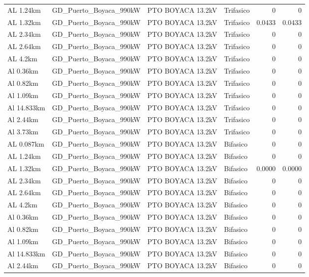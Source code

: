 \documentclass[11pt,a4paper]{article}
\begin{document}
\begin{longtable}{llllrr}
AL 1.24km & GD\_Puerto\_Boyaca\_990kW & PTO BOYACA 13.2kV & Trifasico & 0 & 0 \\
AL 1.32km & GD\_Puerto\_Boyaca\_990kW & PTO BOYACA 13.2kV & Trifasico & 0.0433 & 0.0433 \\
AL 2.34km & GD\_Puerto\_Boyaca\_990kW & PTO BOYACA 13.2kV & Trifasico & 0 & 0 \\
AL 2.64km & GD\_Puerto\_Boyaca\_990kW & PTO BOYACA 13.2kV & Trifasico & 0 & 0 \\
AL 4.2km & GD\_Puerto\_Boyaca\_990kW & PTO BOYACA 13.2kV & Trifasico & 0 & 0 \\
Al 0.36km & GD\_Puerto\_Boyaca\_990kW & PTO BOYACA 13.2kV & Trifasico & 0 & 0 \\
Al 0.82km & GD\_Puerto\_Boyaca\_990kW & PTO BOYACA 13.2kV & Trifasico & 0 & 0 \\
Al 1.09km & GD\_Puerto\_Boyaca\_990kW & PTO BOYACA 13.2kV & Trifasico & 0 & 0 \\
Al 14.833km & GD\_Puerto\_Boyaca\_990kW & PTO BOYACA 13.2kV & Trifasico & 0 & 0 \\
Al 2.44km & GD\_Puerto\_Boyaca\_990kW & PTO BOYACA 13.2kV & Trifasico & 0 & 0 \\
Al 3.73km & GD\_Puerto\_Boyaca\_990kW & PTO BOYACA 13.2kV & Trifasico & 0 & 0 \\
AL 0.087km & GD\_Puerto\_Boyaca\_990kW & PTO BOYACA 13.2kV & Bifasico & 0 & 0 \\
AL 1.24km & GD\_Puerto\_Boyaca\_990kW & PTO BOYACA 13.2kV & Bifasico & 0 & 0 \\
AL 1.32km & GD\_Puerto\_Boyaca\_990kW & PTO BOYACA 13.2kV & Bifasico & 0.0000 & 0.0000 \\
AL 2.34km & GD\_Puerto\_Boyaca\_990kW & PTO BOYACA 13.2kV & Bifasico & 0 & 0 \\
AL 2.64km & GD\_Puerto\_Boyaca\_990kW & PTO BOYACA 13.2kV & Bifasico & 0 & 0 \\
AL 4.2km & GD\_Puerto\_Boyaca\_990kW & PTO BOYACA 13.2kV & Bifasico & 0 & 0 \\
Al 0.36km & GD\_Puerto\_Boyaca\_990kW & PTO BOYACA 13.2kV & Bifasico & 0 & 0 \\
Al 0.82km & GD\_Puerto\_Boyaca\_990kW & PTO BOYACA 13.2kV & Bifasico & 0 & 0 \\
Al 1.09km & GD\_Puerto\_Boyaca\_990kW & PTO BOYACA 13.2kV & Bifasico & 0 & 0 \\
Al 14.833km & GD\_Puerto\_Boyaca\_990kW & PTO BOYACA 13.2kV & Bifasico & 0 & 0 \\
Al 2.44km & GD\_Puerto\_Boyaca\_990kW & PTO BOYACA 13.2kV & Bifasico & 0 & 0 \\

\end{longtable}
\end{document}
